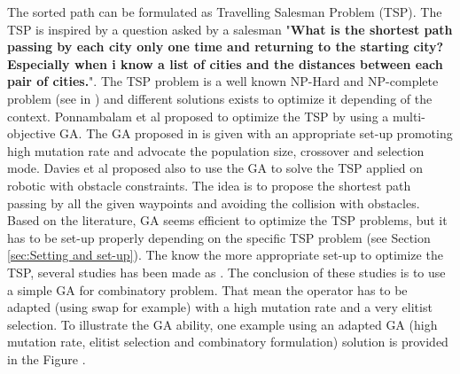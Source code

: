 The sorted path can be formulated as Travelling Salesman Problem (TSP). The TSP is inspired by a question asked by a salesman "\textbf{What is the shortest path passing by each city only one time and returning to the starting city? Especially when i know a list of cities and the distances between each pair of cities.}". The TSP problem is a well known NP-Hard and NP-complete problem (see in \citep{236*karp1972}) and different solutions exists to optimize it depending of the context. 
Ponnambalam et al  \cite{172*ponnambalam2004} proposed to optimize the TSP by using a multi-objective GA. 
The GA proposed in \cite{172*ponnambalam2004} is given with an appropriate set-up promoting high mutation rate and advocate the population size, crossover and selection mode. Davies et al \cite{56*davies2006} proposed also to use the GA to solve the TSP applied on robotic with obstacle constraints. The idea is to propose the shortest path passing by all the given waypoints and avoiding the collision with obstacles.  \\
Based on the literature, GA seems efficient to optimize the TSP problems, but it has to be set-up properly depending on the specific TSP problem (see Section \ref{sec:Setting and set-up}). 
The know the more appropriate set-up to optimize the TSP, several studies has been made as \citep{68*muhlenbein1989,80*serpell2010,139*razali2011}. The conclusion of these studies is to use a simple GA for combinatory problem. That mean the operator has to be adapted (using swap for example) with a high mutation rate and a very elitist selection.
To illustrate the GA ability, one example using an adapted GA (high mutation rate,  elitist selection and combinatory formulation) solution is provided in the Figure .





